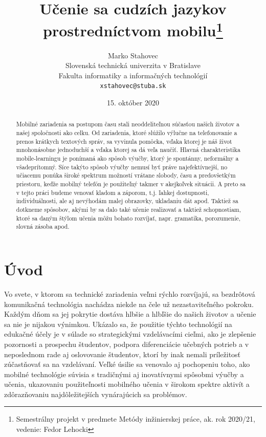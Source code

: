 \documentclass[10pt,oneside,slovak,a4paper]{article}
\title{Učenie sa cudzích jazykov prostredníctvom mobilu\thanks{Semestrálny projekt v predmete Metódy inžinierskej práce, ak. rok 2020/21, vedenie: Fedor Lehocki}} %
\author{Marko Stahovec\\[2pt]
	{\small Slovenská technická univerzita v Bratislave}\\
	{\small Fakulta informatiky a informačných technológií}\\
	{\small \texttt{xstahovec@stuba.sk}}
	}
\date{\small 15. október 2020}
\begin{document}
\maketitle

\begin{abstract}
Mobilné zariadenia sa postupom času stali neoddeliteľnou súčasťou našich životov a našej spoločnosti ako celku. Od zariadenia, ktoré slúžilo výlučne na telefonovanie a prenos krátkych textových správ, sa vyvinula pomôcka, vďaka ktorej je náš život mnohonásobne jednoduchší a vďaka ktorej sa dá veľa naučiť. Hlavná charakteristika mobile-learningu je ponímaná ako spôsob výučby, ktorý je spontánny, neformálny a všadeprítomný. Síce takýto spôsob výučby nemusí byť práve najefektívnejší, no učiacemu ponúka široké spektrum možností vrátane slobody, času a predovšetkým priestoru, keďže mobilný telefón je použiteľný takmer v akejkoľvek situácii. A preto sa v tejto práci budeme venovať kladom a záporom, t.j. ľahkej dostupnosti, individuálnosti, ale aj nevýhodám malej obrazovky, ukladaniu dát apod. Taktiež sa dotkneme spôsobov, akými by sa dalo také učenie realizovať a taktiež schopnostiam, ktoré sa daným štýlom učenia môžu bohato rozvíjať, napr. gramatika, porozumenie, slovná zásoba apod.
\end{abstract}



\section{Úvod}


Vo svete, v ktorom sa technické zariadenia veľmi rýchlo rozvíjajú, sa bezdrôtová komunikačná technológia nachádza niekde na čele už nezastaviteľného pokroku\cite{Miangah2012}. Každým dňom sa jej pokrytie dostáva hlbšie a hlbľšie do našich životov a učenie sa nie je nijakou výnimkou. Ukázalo sa, že použitie týchto technológií na edukačné účely je v súlade so strategickými vzdelávacími cieľmi, ako je zlepšenie pozornosti a prospechu študentov, podpora diferenciácie učebných potrieb a v neposlednom rade aj oslovovanie študentov, ktorí by inak nemali príležitosť zúčastňovať sa na vzdelávaní\cite{KukulskaHulme2009}. Veľké úsilie sa venovalo aj pochopeniu toho, ako mobilné technológie súvisia s tradičnými aj inovatívnymi spôsobmi výučby a učenia, ukazovaniu použiteľnosti mobilného učenia v širokom spektre aktivít a zdôrazňovaniu najdôležitejších vynárajúcich sa problémov\cite{KukulskaHulme2009}. 
\end{document}
